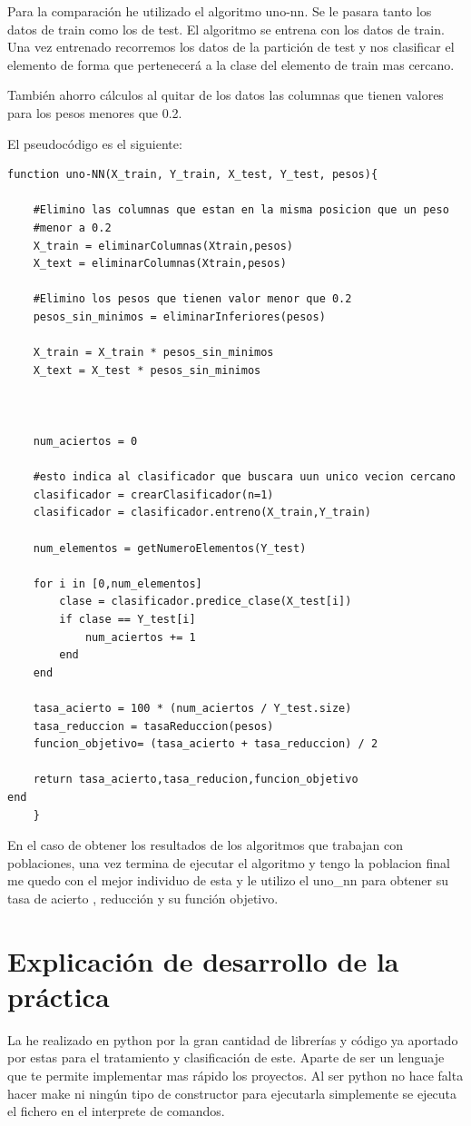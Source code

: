 \documentclass[titlepage]{article}
\begin{document}
	
	Para la comparación he utilizado el algoritmo uno-nn. Se le pasara tanto los datos de train como los de test. El algoritmo se entrena con los datos de train. Una vez entrenado recorremos los datos de la partición de test y nos clasificar el elemento de forma que pertenecerá a la clase del elemento de train mas cercano.
	
	
	También ahorro cálculos al quitar de los datos las columnas que tienen valores para los pesos menores que 0.2. 
	
	El pseudocódigo es el siguiente:

	
	\begin{lstlisting}
function uno-NN(X_train, Y_train, X_test, Y_test, pesos){
	
	#Elimino las columnas que estan en la misma posicion que un peso 
	#menor a 0.2
	X_train = eliminarColumnas(Xtrain,pesos)
	X_text = eliminarColumnas(Xtrain,pesos)
	
	#Elimino los pesos que tienen valor menor que 0.2
	pesos_sin_minimos = eliminarInferiores(pesos)
	
	X_train = X_train * pesos_sin_minimos
	X_text = X_test * pesos_sin_minimos
	
	
	
	num_aciertos = 0
	
	#esto indica al clasificador que buscara uun unico vecion cercano
	clasificador = crearClasificador(n=1)
	clasificador = clasificador.entreno(X_train,Y_train)
	
	num_elementos = getNumeroElementos(Y_test)
	
	for i in [0,num_elementos]
		clase = clasificador.predice_clase(X_test[i])
		if clase == Y_test[i]
			num_aciertos += 1
		end
	end
	
	tasa_acierto = 100 * (num_aciertos / Y_test.size)
	tasa_reduccion = tasaReduccion(pesos)
	funcion_objetivo= (tasa_acierto + tasa_reduccion) / 2
	
	return tasa_acierto,tasa_reducion,funcion_objetivo
end
	}
	\end{lstlisting}
	
	En el caso de obtener los resultados de los algoritmos que trabajan con poblaciones, una vez termina de ejecutar el algoritmo y tengo la poblacion final me quedo con el mejor individuo de esta y le utilizo el uno\_nn para obtener su tasa de acierto , reducción y su función objetivo. 
	
	
	\newpage
	
	\section{Explicación de desarrollo de la práctica}
	La he realizado en python por la gran cantidad de librerías y código ya aportado por estas para el tratamiento y clasificación de este.
	Aparte de ser un lenguaje que te permite implementar mas rápido los proyectos.
	Al ser python no hace falta hacer make ni ningún tipo de constructor para ejecutarla simplemente se ejecuta el fichero en el interprete de comandos.
	
\end{document}
